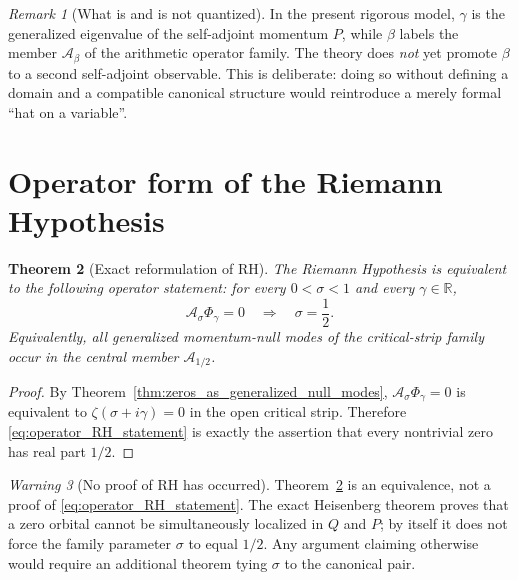 \documentclass[11pt]{amsart}
\numberwithin{equation}{section}
\theoremstyle{plain}
\newtheorem{theorem}{Theorem}[section]
\theoremstyle{definition}
\theoremstyle{remark}
\newtheorem{remark}[theorem]{Remark}
\newtheorem{warning}[theorem]{Warning}
\newcommand{\R}{\mathbb{R}}
\begin{document}
\begin{remark}[What is and is not quantized]
\label{rem:beta_parameter_gamma_momentum}
In the present rigorous model, $\gamma$ is the generalized eigenvalue of
the self-adjoint momentum $P$, while $\beta$ labels the member
$\mathcal A_\beta$ of the arithmetic operator family.  The theory does
\emph{not} yet promote $\beta$ to a second self-adjoint observable.  This is
deliberate: doing so without defining a domain and a compatible canonical
structure would reintroduce a merely formal ``hat on a variable''.
\end{remark}

\section{Operator form of the Riemann Hypothesis}
\label{sec:operator_RH}

\begin{theorem}[Exact reformulation of RH]
\label{thm:operator_RH_equivalence}
The Riemann Hypothesis is equivalent to the following operator statement:
for every $0<\sigma<1$ and every $\gamma\in\R$,
\begin{equation}
\mathcal A_\sigma\Phi_\gamma=0
\quad\Longrightarrow\quad
\sigma=\frac12.
\label{eq:operator_RH_statement}
\end{equation}
Equivalently, all generalized momentum-null modes of the critical-strip
family occur in the central member $\mathcal A_{1/2}$.
\end{theorem}

\begin{proof}
By Theorem~\ref{thm:zeros_as_generalized_null_modes},
$\mathcal A_\sigma\Phi_\gamma=0$ is equivalent to
$\zeta(\sigma+i\gamma)=0$ in the open critical strip.  Therefore
\eqref{eq:operator_RH_statement} is exactly the assertion that every
nontrivial zero has real part $1/2$.
\end{proof}

\begin{warning}[No proof of RH has occurred]
\label{warn:no_RH_proof}
Theorem~\ref{thm:operator_RH_equivalence} is an equivalence, not a proof of
\eqref{eq:operator_RH_statement}.  The exact Heisenberg theorem proves that
a zero orbital cannot be simultaneously localized in $Q$ and $P$; by
itself it does not force the family parameter $\sigma$ to equal $1/2$.
Any argument claiming otherwise would require an additional theorem tying
$\sigma$ to the canonical pair.
\end{warning}
\end{document}
